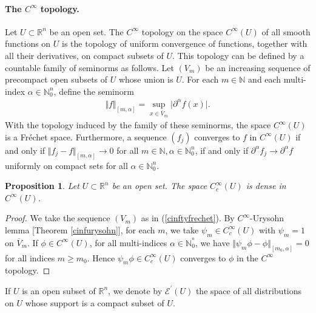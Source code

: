 \documentclass{article}
\numberwithin{equation}{section}
\newcommand{\bbN}{\mathbb{N}}
\newcommand{\bbR}{\mathbb{R}}
\renewcommand{\cal}{\mathcal}
\newcommand{\ol}{\overline}
\theoremstyle{plain}
\newtheorem{proposition}[theorem]{Proposition}
\theoremstyle{definition}
\begin{document}
\paragraph{The $C^\infty$ topology.} Let $U\subset\bbR^n$ be an open set. The $C^\infty$ topology on the space $C^\infty(U)$ of all smooth functions on $U$ is the topology of uniform convergence of functions, together with all their derivatives, on compact subsets of $U$. This topology can be defined by a countable family of seminorms as follows. Let $(V_m)$ be an increasing sequence of precompact open subsets of $U$ whose union is $U$. For each $m\in\bbN$ and each multi-index $\alpha\in\bbN_0^n$, define the seminorm
\begin{align}
	\Vert f\Vert_{[m,\alpha]}=\sup_{x\in\ol{V}_m}\vert\partial^\alpha f(x)\vert.\label{cinftyfrechet}
\end{align}
With the topology induced by the family of these seminorms, the space $C^\infty(U)$ is a Fréchet space. Furthermore, a sequence $(f_j)$ converges to $f$ in $C^\infty(U)$ if and only if $\Vert f_j-f\Vert_{[m,\alpha]}\to 0$ for all $m\in\bbN,\alpha\in\bbN_0^n$, if and only if $\partial^\alpha f_j\to\partial^\alpha f$ uniformly on compact sets for all $\alpha\in\bbN_0^n$.
\begin{proposition}\label{ccinftydenseincinfty}
Let $U\subset\bbR^n$ be an open set. The space $C_c^\infty(U)$ is dense in $C^\infty(U)$.
\end{proposition}
\begin{proof}
We take the sequence $(V_m)$ as in (\ref{cinftyfrechet}). By $C^\infty$-Urysohn lemma [Theorem \ref{cinfurysohn}], for each $m$, we take $\psi_m\in C_c^\infty(U)$ with $\psi_m=1$ on $\ol{V}_m$. If $\phi\in C^\infty(U)$, for all multi-indices $\alpha\in\bbN_0^^n$, we have $\Vert\psi_m\phi-\phi\Vert_{[m_0,\alpha]}=0$ for all indices $m\geq m_0$. Hence $\psi_m\phi\in C_c^\infty(U)$ converges to $\phi$ in the $C^\infty$ topology.
\end{proof}

If $U$ is an open subset of $\bbR^n$, we denote by $\cal{E}^\prime(U)$ the space of all distributions on $U$ whose support is a compact subset of $U$.
\end{document}
